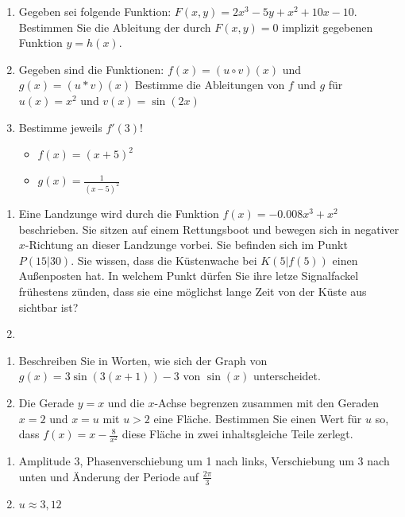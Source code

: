 \begin{enumerate}
	\item Gegeben sei folgende Funktion: $F(x,y)=2x^3-5y+x^2+10x-10$. Bestimmen Sie die Ableitung der durch $F(x,y)=0$ implizit gegebenen Funktion $y=h(x)$.
	\item Gegeben sind die Funktionen:
	$f(x) = (u \circ v)(x)$ und $g(x) = (u* v)(x)$
	Bestimme die Ableitungen von $f$ und $g$ für $u(x)=x^2$ und $v(x)=\sin(2x)$
	\item Bestimme jeweils $f'(3)$!
	\begin{itemize}
		\item $f(x) = (x+5)^2$
		\item $g(x) = \frac{1}{(x-5)^2}$
	\end{itemize}
\end{enumerate}

\cas
\begin{enumerate}
	\item Eine Landzunge wird durch die Funktion $f(x)=-0.008x^3+x^2$ beschrieben.
	Sie sitzen auf einem Rettungsboot und bewegen sich in negativer $x$-Richtung an dieser Landzunge vorbei.
	Sie befinden sich im Punkt $P(15|30)$.
	Sie wissen, dass die Küstenwache bei $K(5|f(5))$ einen Außenposten hat.
	In welchem Punkt dürfen Sie ihre letze Signalfackel frühestens zünden,
	dass sie eine möglichst lange Zeit von der Küste aus sichtbar ist?
  \item
\end{enumerate}

\begin{enumerate}
	\item Beschreiben Sie in Worten, wie sich der Graph von $g(x)=3\sin(3(x+1))-3$ von $\sin(x)$ unterscheidet.
	\item Die Gerade $y=x$ und die $x$-Achse begrenzen zusammen mit den Geraden $x=2$ und $x=u$ mit $u>2$ eine Fläche. Bestimmen Sie einen Wert für $u$ so, dass $f(x)=x-\frac{8}{x^2}$ diese Fläche in zwei inhaltsgleiche Teile zerlegt. \cas
\end{enumerate}
\begin{lsg}{}
  \begin{enumerate}
		\item Amplitude 3, Phasenverschiebung um 1 nach links, Verschiebung um 3 nach unten und Änderung der Periode auf $\frac{2\pi}{3}$
    \item $u\approx 3,12$
  \end{enumerate}
\end{lsg}


